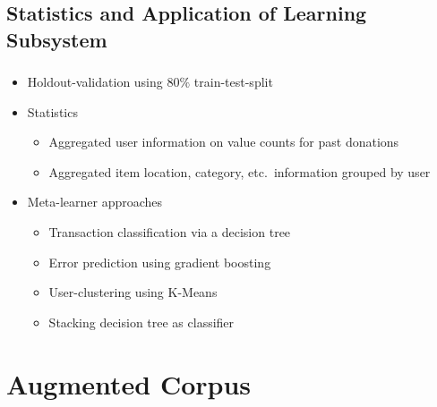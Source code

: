 \documentclass[aspectratio=169]{beamer}
\begin{document}
\subsection{Statistics and Application of Learning Subsystem}
\begin{frame}
	\frametitle{\insertsection}
	\framesubtitle{\insertsubsection}

	\begin{itemize}
		\item Holdout-validation using $80\%$ train-test-split
		\item Statistics
		\begin{itemize}
			\item Aggregated user information on value counts for past donations
			\item Aggregated item location, category, etc.~information grouped by user
		\end{itemize}
		\item Meta-learner approaches
		\begin{itemize}
			\item Transaction classification via a decision tree
			\item Error prediction using gradient boosting
			\item User-clustering using K-Means
			\item Stacking decision tree as classifier
		\end{itemize}
	\end{itemize}
\end{frame}

\section[Results]{Augmented Corpus}
\frame{\vfill\centering\tableofcontents[sectionstyle=show/shaded,subsectionstyle=show/hide]\vfill}
\end{document}
